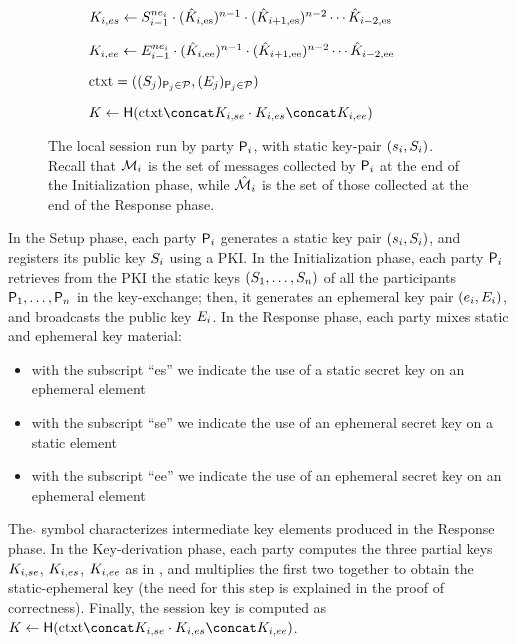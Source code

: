 \begin{figure}
\begin{adjustbox}{varwidth=0.9\textwidth,fbox,center,scale=0.92}
\begin{subfigure}{0.7\linewidth}
\begin{nicodemus}
			\item $\groupesk{i} \gets S_{i-1}^{n\esk_i} \cdot (\tempesk{i})^{n-1} \cdot (\tempesk{i+1})^{n-2} \cdots \tempesk{i-2}$  \\
			\item $\groupeek{i} \gets E_{i-1}^{n\esk_i} \cdot (\tempeek{i})^{n-1} \cdot (\tempeek{i+1})^{n-2} \cdots \tempeek{i-2}$  \\
			\item $\context = ((\spk_j)_{\User[j] \in \PartySet},(\epk_j)_{\User[j] \in \PartySet})$
			\item $K \gets \FSHash (\context \concat \groupsek{i} \cdot \groupesk{i} \concat \groupeek{i})$\\
		\end{nicodemus}
	\end{subfigure}
	\end{adjustbox}
	\caption{The local session run by party $\User[i]$, with static key-pair $(\ssk_i, \spk_i)$. Recall that $\GakeIniMesSet[i]$ is the set of messages collected by $\User[i]$ at the end of the Initialization phase, while $\GakeResMesSet[i]$ is the set of those collected at the end of the Response phase.}
	\label{fig:ourprotocol}
\end{figure}

In the Setup phase, each party $\User[i]$ generates a static key pair $(\ssk_i,\spk_i)$, and registers its public key $\spk_i$ using a PKI.
In the Initialization phase, each party $\User[i]$ retrieves from the PKI the static keys $(\spk_1,\dots,\spk_n)$ of all the participants $\User[1],\dots,\User[n]$  in the key-exchange; then, it generates an ephemeral key pair $(\esk_i,\epk_i)$, and broadcasts the public key $\epk_i$. 
In the Response phase, each party mixes static and ephemeral key material:
\begin{itemize}
	\item with the subscript ``es'' we indicate the use of a static secret key on an ephemeral element
	\item with the subscript ``se'' we indicate the use of an ephemeral secret key on a static element
	\item with the subscript ``ee'' we indicate the use of an ephemeral secret key on an ephemeral element
\end{itemize}
The $\hat{ }$ symbol characterizes intermediate key elements produced in the Response phase.
In the Key-derivation phase, each party computes the three partial keys $\groupsek{i}$, $\groupesk{i}$, $\groupeek{i}$ as in , and multiplies the first two together to obtain the static-ephemeral key (the need for this step is explained in the proof of correctness).
Finally, the session key is computed as $K \gets \FSHash (\context \concat \groupsek{i} \cdot \groupesk{i} \concat \groupeek{i})$.

